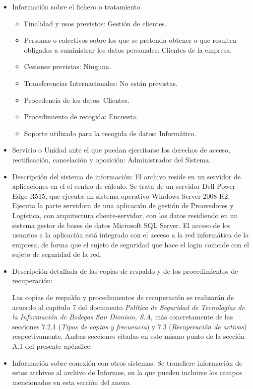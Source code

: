 \documentclass[a4paper,11pt,bibtotoc,noliststotoc]{scrbook}
\begin{document}
\begin{itemize}
\item Información sobre el fichero o tratamiento
	\begin{itemize}
	\item Finalidad y usos previstos: Gestión de clientes.
	\item Personas o colectivos sobre los que se pretenda obtener o que resulten obligados a suministrar los datos personales: Clientes de la empresa.
	\item Cesiones previstas: Ninguna.
	\item Transferencias Internacionales: No están previstas.
	\item Procedencia de los datos: Clientes.
	\item Procedimiento de recogida: Encuesta.
	\item Soporte utilizado para la recogida de datos: Informático.
	\end{itemize}

\item Servicio o Unidad ante el que puedan ejercitarse los derechos de acceso, rectificación, cancelación y oposición: Administrador del Sistema.

\item Descripción del sistema de información: El archivo reside en un servidor de aplicaciones en el el centro de cálculo. Se trata de un servidor Dell Power Edge R515, que ejecuta un sistema operativo Windows Server 2008 R2. Ejecuta la parte servidora de una aplicación de gestión de Proovedores y Logística, con arquitectura cliente-servidor, con los datos residiendo en un sistema gestor de bases de datos Microsoft SQL Server. El acceso de los usuarios a la aplicación está integrado con el acceso a la red informática de la empresa, de forma que el sujeto de seguridad que hace el login coincide con el sujeto de seguridad de la red.

\item Descripción detallada de las copias de respaldo y de los procedimientos de recuperación:

Las copias de respaldo y procedimientos de recuperación se realizarán de acuerdo al capítulo 7 del documento \emph{Política de Seguridad de Tecnologías de la Información de Bodegas San Dionisio, S.A}, más concretamente de las secciones 7.2.1 (\emph{Tipos de copias y frecuencia}) y 7.3 (\emph{Recuperación de activos}) respectivamente. Ambas secciones citadas en este mismo punto de la sección A.1 del presente apéndice.

\item Información sobre conexión con otros sistemas: Se transfiere información de estos archivos al archivo de Informes, en la que pueden incluirse los campos mencionados en esta sección del anexo.


\end{itemize}
\end{document}
